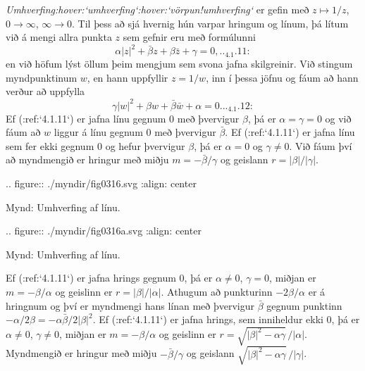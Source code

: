 \smallskip\noindent
{\it Umhverfing:hover:`umhverfing`:hover:`vörpun!umhverfing`} er gefin
með $z\mapsto 1/z$, $0\to {\infty}$, ${\infty}\to 0$.  Til þess að
sjá hvernig hún varpar hringum og línum, þá lítum við á mengi allra
punkta $z$ sem gefnir eru með formúlunni
\begin{equation}
{\alpha}|z|^2+\bar {\beta} z+{\beta}\bar z +{\gamma}=0,


.. _4.1.11:

\end{equation}
en við höfum lýst öllum þeim mengjum sem svona jafna skilgreinir.
Við stingum myndpunktinum  $w$, en hann uppfyllir $z=1/w$, inn 
í þessa jöfnu og fáum að hann verður að uppfylla
\begin{equation}
{\gamma}|w|^2+{\beta}w+\bar {\beta}\bar w +{\alpha}=0.


.. _4.1.12:

\end{equation}
Ef (:ref:`4.1.11`) er jafna línu gegnum $0$ með þvervigur ${\beta}$, þá er
${\alpha}={\gamma}=0$ og við fáum að $w$ liggur á línu gegnum $0$ með
þvervigur $\bar {\beta}$.  Ef (:ref:`4.1.11`) er jafna línu sem fer ekki gegnum
$0$ og hefur þvervigur ${\beta}$, þá er ${\alpha}=0$ og ${\gamma}\neq
0$.  Við fáum því að myndmengið er hringur með miðju $m=-\bar
{\beta}/{\gamma}$  og geislann $r=|{\beta}|/|{\gamma}|$.




.. figure:: ./myndir/fig0316.svg
    :align: center

    Mynd: Umhverfing af línu.




.. figure:: ./myndir/fig0316a.svg
    :align: center

    Mynd: Umhverfing af línu.



\noindent
Ef (:ref:`4.1.11`) er jafna hrings gegnum $0$, þá er ${\alpha}\neq 0$,
${\gamma}=0$, miðjan er $m=-{\beta}/{\alpha}$ og geislinn 
er $r=|{\beta}|/|{\alpha}|$.  Athugum að punkturinn $-2{\beta}/{\alpha}$
er á hringnum og því er myndmengi hans línan með þvervigur
$\bar {\beta}$ gegnum punktinn
$-{\alpha}/2{\beta}=-{\alpha}\bar{\beta}/2|{\beta}|^2$.
Ef (:ref:`4.1.11`) er jafna hrings, sem inniheldur ekki $0$, þá er
${\alpha}\neq 0$, ${\gamma}\neq 0$, miðjan er
$m=-{\beta}/{\alpha}$ og geislinn er
$r=\sqrt{|{\beta}|^2-{\alpha}{\gamma}}\, /|{\alpha}|$.  Myndmengið er hringur
með miðju $-\bar {\beta}/{\gamma}$ og  geislann
$\sqrt{|{\beta}|^2-{\alpha}{\gamma}}\, /|{\gamma}|$.
 
